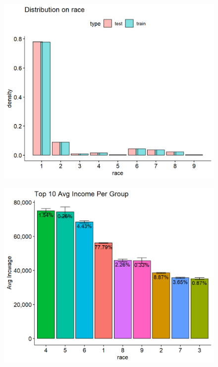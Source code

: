\documentclass[11pt, letter,twocolumn]{article}
\begin{document}
\begin{figure}[ht]
	\centering
	\label{fig:unnamed-chunk-7-5}
	\includegraphics[width=0.9\linewidth]{imgs/preliminary_analysis/unnamed-chunk-7-5}
\end{figure}
\begin{figure}[ht]
	\centering

	\label{fig:unnamed-chunk-7-6}
	\includegraphics[width=0.9\linewidth]{imgs/preliminary_analysis/unnamed-chunk-7-6}
\end{figure}
\end{document}

